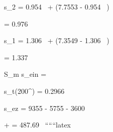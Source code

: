\quad s_2 = 0.954 \,  +  \quad (7.7553 - 0.954 \, )

\quad = 0.976 \, 


\quad s_1 = 1.306 \,  +  \quad (7.3549 - 1.306 \, )

\quad = 1.337 \, 

\quad S_m s_{ein} = 

\quad s_t(200^\circ {}) = 0.2966 \, 

\quad s_{ez} = 9355  - 5755  - 3600 

\quad +  = 487.69 \, 
``````latex


